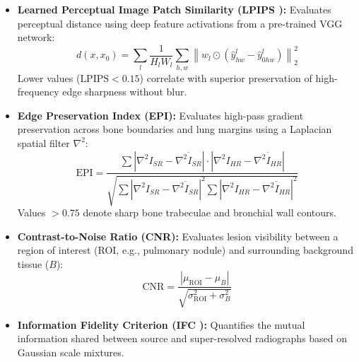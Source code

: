 \documentclass[conference]{IEEEtran}
\begin{document}
\begin{itemize}
    \begin{equation}
        \text{MS-SSIM}(x,y) = [l_M(x,y)]^{\alpha_M} \prod_{j=1}^M [c_j(x,y)]^{\beta_j} [s_j(x,y)]^{\gamma_j}
    \end{equation}
    \item \textbf{Learned Perceptual Image Patch Similarity (LPIPS \cite{zhang2018unreasonable}):} Evaluates perceptual distance using deep feature activations from a pre-trained VGG network:
    \begin{equation}
        d(x, x_0) = \sum_l \frac{1}{H_l W_l} \sum_{h,w} \left\| w_l \odot \left( \hat{y}_{hw}^{l} - \hat{y}_{0hw}^{l} \right) \right\|_2^2
    \end{equation}
    Lower values ($\text{LPIPS} < 0.15$) correlate with superior preservation of high-frequency edge sharpness without blur.
    \item \textbf{Edge Preservation Index (EPI):} Evaluates high-pass gradient preservation across bone boundaries and lung margins using a Laplacian spatial filter $\nabla^2$:
    \begin{equation}
        \text{EPI} = \frac{\sum | \nabla^2 I_{SR} - \overline{\nabla^2 I_{SR}} | \cdot | \nabla^2 I_{HR} - \overline{\nabla^2 I_{HR}} |}{\sqrt{\sum | \nabla^2 I_{SR} - \overline{\nabla^2 I_{SR}} |^2 \sum | \nabla^2 I_{HR} - \overline{\nabla^2 I_{HR}} |^2}}
    \end{equation}
    Values $> 0.75$ denote sharp bone trabeculae and bronchial wall contours.
    \item \textbf{Contrast-to-Noise Ratio (CNR):} Evaluates lesion visibility between a region of interest (ROI, e.g., pulmonary nodule) and surrounding background tissue ($B$):
    \begin{equation}
        \text{CNR} = \frac{|\mu_{\text{ROI}} - \mu_B|}{\sqrt{\sigma_{\text{ROI}}^2 + \sigma_B^2}}
    \end{equation}
    \item \textbf{Information Fidelity Criterion (IFC \cite{sheikh2005information}):} Quantifies the mutual information shared between source and super-resolved radiographs based on Gaussian scale mixtures.
\end{itemize}
\end{document}
